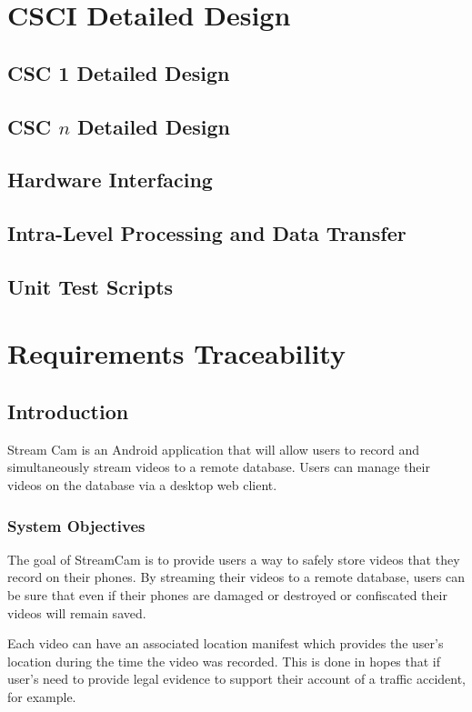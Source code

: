 \documentclass[11pt,a4paper,titlepage]{article}
\begin{document}
\section{CSCI Detailed Design}
\subsection{CSC 1 Detailed Design}
\subsection{CSC $n$ Detailed Design}
\subsection{Hardware Interfacing}
\subsection{Intra-Level Processing and Data Transfer}
\subsection{Unit Test Scripts}

\section{Requirements Traceability}
\subsection{Introduction}
Stream Cam is an Android application that will allow users to record and simultaneously stream videos to a remote database. Users can manage their videos on the database via a desktop web client.
\subsubsection{System Objectives}
The goal of StreamCam is to provide users a way to safely store videos that they record on their phones. By streaming their videos to a remote database, users can be sure that even if their phones are damaged or destroyed or confiscated their videos will remain saved. 

Each video can have an associated location manifest which provides the user's location during the time the video was recorded. This is done in hopes that if user's need to provide legal evidence to support their account of a traffic accident, for example. 
\end{document}
